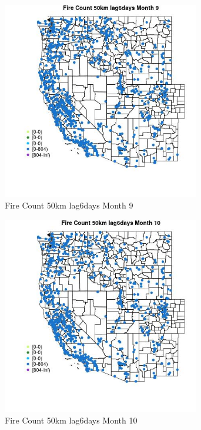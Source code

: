 \begin{figure} 
\centering  
\includegraphics[width=0.77\textwidth]{Code_Outputs/Report_ML_input_PM25_Step4_part_f_de_duplicated_aves_prioritize_24hr_obswNAs_MapObsMo9Fire_Count_50km_lag6days.jpg} 
\caption{\label{fig:Report_ML_input_PM25_Step4_part_f_de_duplicated_aves_prioritize_24hr_obswNAsMapObsMo9Fire_Count_50km_lag6days}Fire Count 50km lag6days Month 9} 
\end{figure} 
 

\begin{figure} 
\centering  
\includegraphics[width=0.77\textwidth]{Code_Outputs/Report_ML_input_PM25_Step4_part_f_de_duplicated_aves_prioritize_24hr_obswNAs_MapObsMo10Fire_Count_50km_lag6days.jpg} 
\caption{\label{fig:Report_ML_input_PM25_Step4_part_f_de_duplicated_aves_prioritize_24hr_obswNAsMapObsMo10Fire_Count_50km_lag6days}Fire Count 50km lag6days Month 10} 
\end{figure} 
 

